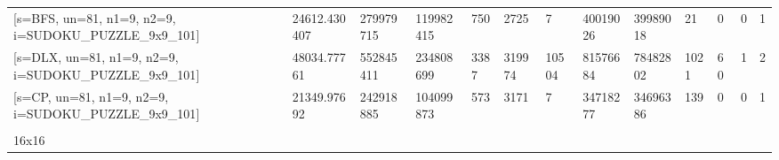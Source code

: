 \documentclass[10pt,twocolumn]{article}
\begin{document}
\begin{table}[p]
{\begin{tabular}{@{}lllllllllllll@{}}
    {\color[HTML]{000000} {[}s=BFS, un=81, n1=9, n2=9, i=SUDOKU\_PUZZLE\_9x9\_101{]}}     & {\color[HTML]{000000} 24612.430407}  & {\color[HTML]{000000} 279979715}    & {\color[HTML]{000000} 119982415}    & {\color[HTML]{000000} 750}            & {\color[HTML]{000000} 2725}         & {\color[HTML]{000000} 7}           & {\color[HTML]{000000} 40019026}     & {\color[HTML]{000000} 39989018}      & {\color[HTML]{000000} 21}     & {\color[HTML]{000000} 0}        & {\color[HTML]{000000} 0}         & {\color[HTML]{000000} 1}              \\
    {\color[HTML]{000000} {[}s=DLX, un=81, n1=9, n2=9, i=SUDOKU\_PUZZLE\_9x9\_101{]}}     & {\color[HTML]{000000} 48034.77761}   & {\color[HTML]{000000} 552845411}    & {\color[HTML]{000000} 234808699}    & {\color[HTML]{000000} 3387}           & {\color[HTML]{000000} 319974}       & {\color[HTML]{000000} 10504}       & {\color[HTML]{000000} 81576684}     & {\color[HTML]{000000} 78482802}      & {\color[HTML]{000000} 1021}   & {\color[HTML]{000000} 60}       & {\color[HTML]{000000} 1}         & {\color[HTML]{000000} 2}              \\
    {\color[HTML]{000000} {[}s=CP, un=81, n1=9, n2=9, i=SUDOKU\_PUZZLE\_9x9\_101{]}}      & {\color[HTML]{000000} 21349.97692}   & {\color[HTML]{000000} 242918885}    & {\color[HTML]{000000} 104099873}    & {\color[HTML]{000000} 573}            & {\color[HTML]{000000} 3171}         & {\color[HTML]{000000} 7}           & {\color[HTML]{000000} 34718277}     & {\color[HTML]{000000} 34696386}      & {\color[HTML]{000000} 139}    & {\color[HTML]{000000} 0}        & {\color[HTML]{000000} 0}         & {\color[HTML]{000000} 1}              \\
    {\color[HTML]{000000} }                                                               & {\color[HTML]{000000} }              & {\color[HTML]{000000} }             & {\color[HTML]{000000} }             & {\color[HTML]{000000} }               & {\color[HTML]{000000} }             & {\color[HTML]{000000} }            & {\color[HTML]{000000} }             & {\color[HTML]{000000} }              & {\color[HTML]{000000} }       & {\color[HTML]{000000} }         & {\color[HTML]{000000} }          & {\color[HTML]{000000} }               \\
    {\color[HTML]{000000} 16x16}                                                          & {\color[HTML]{000000} }              & {\color[HTML]{000000} }             & {\color[HTML]{000000} }             & {\color[HTML]{000000} }               & {\color[HTML]{000000} }             & {\color[HTML]{000000} }            & {\color[HTML]{000000} }             & {\color[HTML]{000000} }              & {\color[HTML]{000000} }       & {\color[HTML]{000000} }         & {\color[HTML]{000000} }          & {\color[HTML]{000000} }               \\

\end{tabular}}
\end{table}
\end{document}
